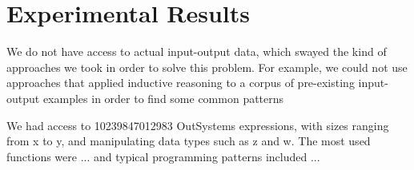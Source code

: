 \chapter{Experimental Results}
\label{chap:experimental-results}

We do not have access to actual input-output data, which swayed the kind of
approaches we took in order to solve this problem. For example, we could not
use approaches that applied inductive reasoning to a corpus of pre-existing
input-output examples in order to find some common patterns 


We had access to 10239847012983 OutSystems expressions, with sizes ranging from
x to y, and manipulating data types such as z and w. The most used functions
were ... and typical programming patterns included ...


